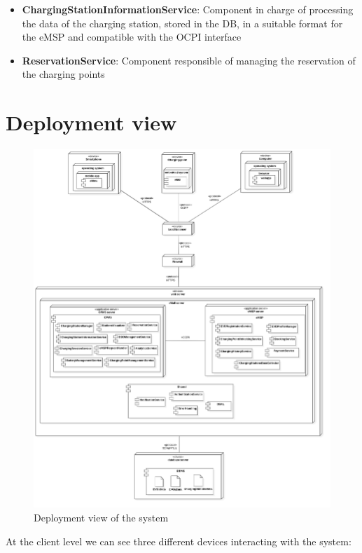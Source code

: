 \begin{itemize}
    \item \textbf{ChargingStationInformationService}: Component in charge of processing the data of the charging station, stored in the DB, in a suitable format for the eMSP and compatible with the OCPI interface

    \item \textbf{ReservationService}: Component responsible of managing the reservation of the charging points 

\end{itemize}

\section{Deployment view}
\begin{figure}[H]
    \centering
    \includegraphics[width=1\textwidth, height=0.9\textheight]{Images/cp2/DeploymentDiagram.png}
    \caption{Deployment view of the system}
\end{figure}
At the client level we can see three different devices interacting with the system:
